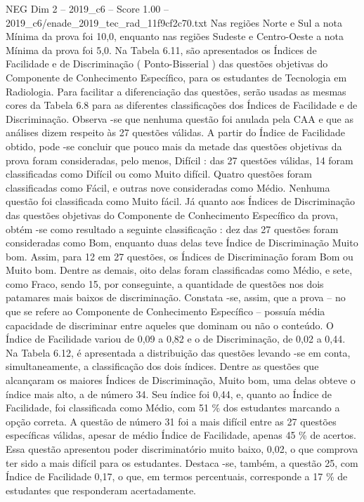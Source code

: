 \begin{textsample}{NEG Dim 2 – 2019\_c6 – Score 1.00 – 2019\_c6/enade\_2019\_tec\_rad\_11f9cf2c70.txt}
Nas regiões Norte e Sul a nota Mínima da prova foi 10,0, enquanto nas regiões Sudeste e Centro-Oeste a nota Mínima da prova foi 5,0.
Na Tabela 6.11, são apresentados os Índices de Facilidade e de Discriminação ( Ponto-Bisserial ) das questões objetivas do Componente de Conhecimento Específico, para os estudantes de Tecnologia em Radiologia.
Para facilitar a diferenciação das questões, serão usadas as mesmas cores da Tabela 6.8 para as diferentes classificações dos Índices de Facilidade e de Discriminação.
Observa -se que nenhuma questão foi anulada pela CAA e que as análises dizem respeito às 27 questões válidas.
A partir do Índice de Facilidade obtido, pode -se concluir que pouco mais da metade das questões objetivas da prova foram consideradas, pelo menos, Difícil : das 27 questões válidas, 14 foram classificadas como Difícil ou como Muito difícil.
Quatro questões foram classificadas como Fácil, e outras nove consideradas como Médio.
Nenhuma questão foi classificada como Muito fácil.
Já quanto aos Índices de Discriminação das questões objetivas do Componente de Conhecimento Específico da prova, obtém -se como resultado a seguinte classificação : dez das 27 questões foram consideradas como Bom, enquanto duas delas teve Índice de Discriminação Muito bom.
Assim, para 12 em 27 questões, os Índices de Discriminação foram Bom ou Muito bom.
Dentre as demais, oito delas foram classificadas como Médio, e sete, como Fraco, sendo 15, por conseguinte, a quantidade de questões nos dois patamares mais baixos de discriminação.
Constata -se, assim, que a prova – no que se refere ao Componente de Conhecimento Específico – possuía média capacidade de discriminar entre aqueles que dominam ou não o conteúdo.
O Índice de Facilidade variou de 0,09 a 0,82 e o de Discriminação, de 0,02 a 0,44.
Na Tabela 6.12, é apresentada a distribuição das questões levando -se em conta, simultaneamente, a classificação dos dois índices.
Dentre as questões que alcançaram os maiores Índices de Discriminação, Muito bom, uma delas obteve o índice mais alto, a de número 34.
Seu índice foi 0,44, e, quanto ao Índice de Facilidade, foi classificada como Médio, com 51 \% dos estudantes marcando a opção correta.
A questão de número 31 foi a mais difícil entre as 27 questões específicas válidas, apesar de médio Índice de Facilidade, apenas 45 \% de acertos.
Essa questão apresentou poder discriminatório muito baixo, 0,02, o que comprova ter sido a mais difícil para os estudantes.
Destaca -se, também, a questão 25, com Índice de Facilidade 0,17, o que, em termos percentuais, corresponde a 17 \% de estudantes que responderam acertadamente.

\end{textsample}
